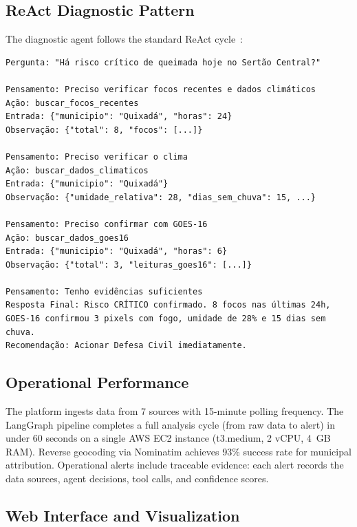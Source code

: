 \documentclass[5p,twocolumn]{elsarticle}
\begin{document}
\subsection{ReAct Diagnostic Pattern}

The diagnostic agent follows the standard ReAct cycle~\cite{langchain2025}:

\begin{verbatim}
Pergunta: "Há risco crítico de queimada hoje no Sertão Central?"

Pensamento: Preciso verificar focos recentes e dados climáticos
Ação: buscar_focos_recentes
Entrada: {"municipio": "Quixadá", "horas": 24}
Observação: {"total": 8, "focos": [...]}

Pensamento: Preciso verificar o clima
Ação: buscar_dados_climaticos
Entrada: {"municipio": "Quixadá"}
Observação: {"umidade_relativa": 28, "dias_sem_chuva": 15, ...}

Pensamento: Preciso confirmar com GOES-16
Ação: buscar_dados_goes16
Entrada: {"municipio": "Quixadá", "horas": 6}
Observação: {"total": 3, "leituras_goes16": [...]}

Pensamento: Tenho evidências suficientes
Resposta Final: Risco CRÍTICO confirmado. 8 focos nas últimas 24h,
GOES-16 confirmou 3 pixels com fogo, umidade de 28% e 15 dias sem chuva.
Recomendação: Acionar Defesa Civil imediatamente.
\end{verbatim}

\subsection{Operational Performance}

The platform ingests data from 7 sources with 15-minute polling frequency. The LangGraph pipeline completes a full analysis cycle (from raw data to alert) in under 60 seconds on a single AWS EC2 instance (t3.medium, 2 vCPU, 4~GB RAM). Reverse geocoding via Nominatim achieves 93\% success rate for municipal attribution. Operational alerts include traceable evidence: each alert records the data sources, agent decisions, tool calls, and confidence scores.

\subsection{Web Interface and Visualization}
\end{document}
